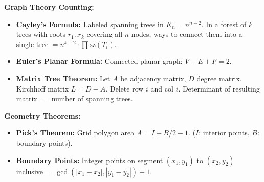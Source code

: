 \textbf{Graph Theory Counting:}
\begin{itemize}
    \item \textbf{Cayley's Formula:} Labeled spanning trees in $K_n = n^{n-2}$. In a forest of $k$ trees with roots $r_1..r_k$ covering all $n$ nodes, ways to connect them into a single tree $= n^{k-2} \cdot \prod \text{sz}(T_i)$.
    \item \textbf{Euler's Planar Formula:} Connected planar graph: $V - E + F = 2$.
    \item \textbf{Matrix Tree Theorem:} Let $A$ be adjacency matrix, $D$ degree matrix. Kirchhoff matrix $L = D - A$. Delete row $i$ and col $i$. Determinant of resulting matrix $=$ number of spanning trees.
\end{itemize}

\textbf{Geometry Theorems:}
\begin{itemize}
    \item \textbf{Pick's Theorem:} Grid polygon area $A = I + B/2 - 1$. ($I$: interior points, $B$: boundary points).
    \item \textbf{Boundary Points:} Integer points on segment $(x_1, y_1)$ to $(x_2, y_2)$ inclusive $=\gcd(|x_1 - x_2|, |y_1 - y_2|) + 1$.
\end{itemize}
